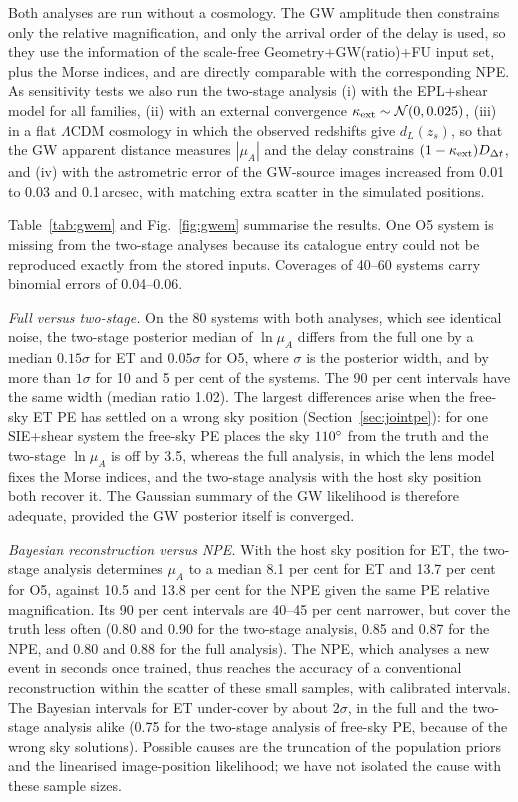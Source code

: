 Both analyses are run without a cosmology. The GW amplitude then constrains only the relative magnification, and only the arrival order of the delay is used, so they use the information of the scale-free Geometry+GW(ratio)+FU input set, plus the Morse indices, and are directly comparable with the corresponding NPE. As sensitivity tests we also run the two-stage analysis (i) with the EPL+shear model for all families, (ii) with an external convergence $\kappa_{\rm ext}\sim\mathcal N(0,0.025)$, (iii) in a flat $\Lambda$CDM cosmology in which the observed redshifts give $d_L(z_s)$, so that the GW apparent distance measures $|\mu_A|$ and the delay constrains $(1-\kappa_{\rm ext})D_{\Delta t}$, and (iv) with the astrometric error of the GW-source images increased from 0.01 to 0.03 and 0.1\,arcsec, with matching extra scatter in the simulated positions.

Table~\ref{tab:gwem} and Fig.~\ref{fig:gwem} summarise the results. One O5 system is missing from the two-stage analyses because its catalogue entry could not be reproduced exactly from the stored inputs. Coverages of 40--60 systems carry binomial errors of 0.04--0.06.

\emph{Full versus two-stage.} On the 80 systems with both analyses, which see identical noise, the two-stage posterior median of $\ln\mu_A$ differs from the full one by a median $0.15\sigma$ for ET and $0.05\sigma$ for O5, where $\sigma$ is the posterior width, and by more than $1\sigma$ for 10 and 5 per cent of the systems. The 90 per cent intervals have the same width (median ratio 1.02). The largest differences arise when the free-sky ET PE has settled on a wrong sky position (Section~\ref{sec:jointpe}): for one SIE+shear system the free-sky PE places the sky $110\hbox{$^\circ$}$ from the truth and the two-stage $\ln\mu_A$ is off by 3.5, whereas the full analysis, in which the lens model fixes the Morse indices, and the two-stage analysis with the host sky position both recover it. The Gaussian summary of the GW likelihood is therefore adequate, provided the GW posterior itself is converged.

\emph{Bayesian reconstruction versus NPE.} With the host sky position for ET, the two-stage analysis determines $\mu_A$ to a median 8.1 per cent for ET and 13.7 per cent for O5, against 10.5 and 13.8 per cent for the NPE given the same PE relative magnification. Its 90 per cent intervals are 40--45 per cent narrower, but cover the truth less often (0.80 and 0.90 for the two-stage analysis, 0.85 and 0.87 for the NPE, and 0.80 and 0.88 for the full analysis). The NPE, which analyses a new event in seconds once trained, thus reaches the accuracy of a conventional reconstruction within the scatter of these small samples, with calibrated intervals. The Bayesian intervals for ET under-cover by about $2\sigma$, in the full and the two-stage analysis alike (0.75 for the two-stage analysis of free-sky PE, because of the wrong sky solutions). Possible causes are the truncation of the population priors and the linearised image-position likelihood; we have not isolated the cause with these sample sizes.

